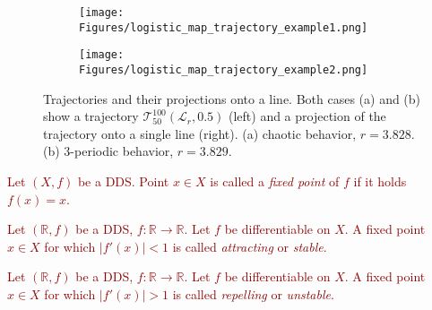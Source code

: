 \begin{figure}[!h]
    \centering
    \begin{subfigure}{0.6\textwidth}
        \centering
        \texttt{[image: Figures/logistic\_map\_trajectory\_example1.png]}
        \caption{}
    \end{subfigure}
    \hfill
    \begin{subfigure}{0.6\textwidth}
        \centering
        \texttt{[image: Figures/logistic\_map\_trajectory\_example2.png]}
        \caption{}
    \end{subfigure}

    \caption{
        Trajectories and their projections onto a line.
        Both cases (a) and (b) show a trajectory $\mathcal{T}_{50}^{100}(\mathcal{L}_{r}, 0.5)$ (left) and a projection of the trajectory onto a single line (right). 
        (a) chaotic behavior, $r = 3.828$. 
        (b) $3$-periodic behavior, $r = 3.829$. 
    }
    \label{fig:trajectory_example}
\end{figure}

\begin{definition}
\label{def:fixed point}
    \textcolor{darkred}{
    Let $\left( X, f \right)$ be a DDS. Point $x \in X$ is called a \emph{fixed point} of $f$ if it holds $f(x) = x$.
    }
\end{definition}

\begin{definition}
\label{def:sfp}
    \textcolor{darkred}{
    Let $\left(\mathbb{R}, f\right)$ be a DDS, $f:\mathbb{R} \rightarrow \mathbb{R}$.
    Let $f$ be differentiable on $X$. 
    A fixed point $x \in X$ for which  $|f'(x)| < 1$ is called \emph{attracting} or \emph{stable}.
    }
\end{definition}

\begin{definition}
\label{def:ufp}
    \textcolor{darkred}{
    Let $\left(\mathbb{R}, f\right)$ be a DDS, $f:\mathbb{R} \rightarrow \mathbb{R}$. 
    Let $f$ be differentiable on $X$. 
    A fixed point $x \in X$ for which $|f'(x)| > 1$ is called \emph{repelling} or \emph{unstable}.
    }
\end{definition}

